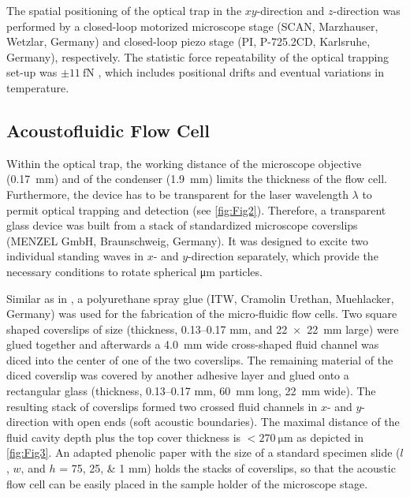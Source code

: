 The spatial positioning of the optical trap in the $xy$-direction and 
$z$-direction was performed by a closed-loop motorized microscope stage (SCAN, 
Marzhauser, Wetzlar, Germany) and closed-loop piezo stage (PI, P-725.2CD, 
Karlsruhe, Germany), respectively. The statistic force repeatability of the 
optical trapping set-up was $\pm \SI{11}{\femto\newton}$ \cite{Lamprecht2016}, 
which includes positional drifts and eventual variations in temperature.

\subsection{Acoustofluidic Flow Cell\label{sec:DeviceAndAcoustics}}

Within the optical trap, the working distance of the microscope objective 
(\SI{0.17}{\milli\meter}) and of the condenser (\SI{1.9}{\milli\meter}) limits 
the thickness of the flow cell.  Furthermore, the device has to be transparent 
for the laser wavelength $\lambda$ to permit optical trapping and detection (see 
\cref{fig:Fig2}). Therefore, a transparent glass device was built from a stack 
of standardized microscope coverslips (MENZEL GmbH, Braunschweig, Germany). It 
was designed to excite two individual standing waves in $x$- and $y$-direction 
separately, which provide the necessary conditions to rotate spherical 
\si{\micro\meter} particles. 

Similar as in \citeauthor{Lakamper} \cite{Lakamper}, a polyurethane spray glue 
(ITW, Cramolin Urethan, Muehlacker, Germany) was used for the fabrication of the 
micro-fluidic flow cells. Two square shaped coverslips of size (thickness, 
\numrange{0.13}{0.17} \si{\milli\meter}, and \SI{22x22}{\mm} large) were glued 
together and afterwards a \SI{4.0}{\milli\meter} wide cross-shaped fluid channel 
was diced into the center of one of the two coverslips. The remaining material 
of the diced coverslip was covered by another adhesive layer and glued onto a 
rectangular glass (thickness, \numrange{0.13}{0.17} \si{\milli\meter}, 
\SI{60}{\mm} long, \SI{22}{\mm} wide). The resulting stack of coverslips formed 
two crossed fluid channels in $x$- and $y$-direction with open ends (soft 
acoustic boundaries). The maximal distance of the fluid cavity depth plus the 
top cover thickness is $< \SI{270}{\micro\meter}$ as depicted in 
\cref{fig:Fig3}. An adapted phenolic paper with the size of a standard specimen 
slide ($l$, $w$, and $h$ = \numlist{75; 25; 1} \si{\mm}) holds the stacks of 
coverslips, so that the acoustic flow cell can be easily placed in the sample 
holder of the microscope stage.

